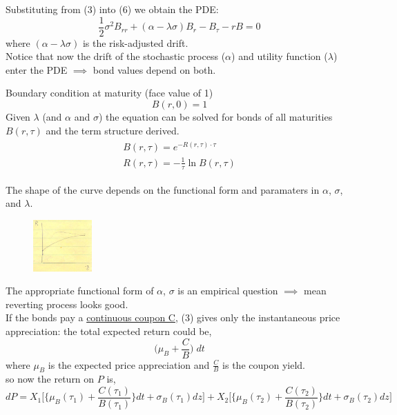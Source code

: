 \documentclass[
14pt,notheorems,hyperref={pdfauthor=whatever}
]{beamer}
\begin{document}
\begin{frame}
Substituting from (3) into (6) we obtain the PDE:\\
\begin{equation} \tag{7}
    \frac{1}{2}\sigma^2 B_{rr} + (\alpha-\lambda\sigma) B_r - B_\tau - rB = 0
\end{equation}
where $(\alpha-\lambda\sigma)$ is the risk-adjusted drift.\\
\hfill\break
Notice that now the drift of the stochastic process ($\alpha$) and utility function ($\lambda$) enter the PDE $\implies$ bond values depend on both.
\end{frame}

\begin{frame}
Boundary condition at maturity (face value of 1)
\begin{equation} \tag{8}
    B(r,0) = 1
\end{equation}
Given $\lambda$ (and $\alpha$ and $\sigma$) the equation can be solved for bonds of all maturities $B(r,\tau)$ and the term structure derived.
\begin{align*} \tag{9}
\begin{split}
    B(r,\tau) = e^{-R(r,\tau)\cdot\tau}
    \\
    R(r,\tau) = -\frac{1}{\tau} \ln{B(r,\tau)}
\end{split}
\end{align*}
\begin{multicols}{2}
    \hfill\break
    The shape of the curve depends on the functional form and paramaters in $\alpha$, $\sigma$, and $\lambda$.
\columnbreak
\begin{figure}[term-structure]
    \includegraphics[width=0.2\textwidth]{images/L17-termstructure.png}
\end{figure}
\end{multicols}
\end{frame}

\begin{frame}
The appropriate functional form of $\alpha$, $\sigma$ is an empirical question $\implies$ mean reverting process looks good.\\
\hfill\break
If the bonds pay a \underline{continuous coupon C}, (3) gives only  the instantaneous price appreciation: the total expected return could be,\\
\[ \bigg(\mu_B + \frac{C}{B}\bigg)\;dt\]
where $\mu_B$ is the expected price appreciation and $\frac{C}{B}$ is the coupon yield.\\
\hfill\break
so now the return on $P$ is,
\[ dP = X_1\bigg[\bigg\{\mu_B(\tau_1)+\frac{C(\tau_1)}{B(\tau_1)}\bigg\}dt + \sigma_B(\tau_1)dz\bigg]+X_2\bigg[\bigg\{\mu_B(\tau_2)+\frac{C(\tau_2)}{B(\tau_2)}\bigg\}dt + \sigma_B(\tau_2)dz\bigg]\]
\end{frame}
\end{document}
